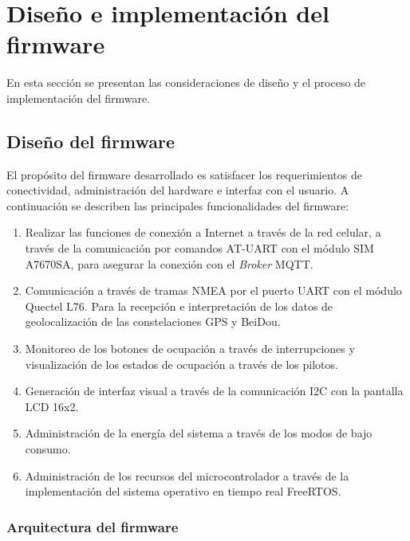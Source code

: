 \section{Diseño e implementación del firmware}

En esta sección se presentan las consideraciones de diseño y el proceso de implementación del firmware. 

\subsection{Diseño del firmware}

El propósito del firmware desarrollado es satisfacer los requerimientos de conectividad, administración del hardware e interfaz con el usuario. A continuación se describen las principales funcionalidades del firmware: 

\begin{enumerate}
 \item Realizar las funciones de conexión a Internet a través de la red celular, a través de la comunicación por comandos AT-UART con el módulo SIM A7670SA, para asegurar la conexión con el \textit{Broker} MQTT.
 \item Comunicación a través de tramas NMEA por el puerto UART con el módulo Quectel L76. Para la recepción e interpretación de los datos de geolocalización de las constelaciones GPS y BeiDou.  
 \item Monitoreo de los botones de ocupación a través de interrupciones y visualización de los estados de ocupación a través de los pilotos. 
 \item Generación de interfaz visual a través de la comunicación I2C con la pantalla LCD 16x2. 
 \item Administración de la energía del sistema a través de los modos de bajo consumo. 
 \item Administración de los recursos del microcontrolador a través de la implementación del sistema operativo en tiempo real FreeRTOS. 
\end{enumerate}

\subsubsection{Arquitectura del firmware}
\label{sec:arquitectura_firmware}

